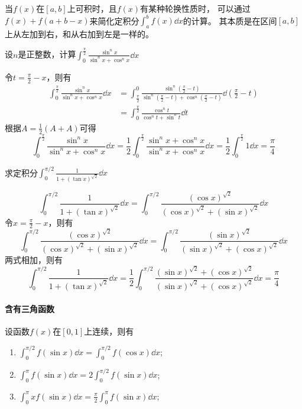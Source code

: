 当$f(x)$在$[a,b]$上可积时，且$f(x)$有某种轮换性质时，
可以通过$f(x)+f(a+b-x)$来简化定积分$\displaystyle\int_a^bf(x)\dd{x}$的计算。
其本质是在区间$[a,b]$上从左加到右，和从右加到左是一样的。
\begin{example}
    设$n$是正整数，计算$\displaystyle\int_0^{\frac{\pi}{2}}\frac{\sin^n x}{\sin^n x + \cos^n x}\dd{x}$
\end{example}
\begin{solution}
    令$t=\frac{\pi}{2}-x$，则有
    \begin{align*}
        \int_0^{\frac{\pi}{2}}\frac{\sin^n x}{\sin^n x + \cos^n x}\dd{x}
         & = \int_{\frac{\pi}{2}}^0\frac{\sin^n \left(\frac{\pi}{2}-t\right)}{\sin^n \left(\frac{\pi}{2}-t\right) + \cos^n \left(\frac{\pi}{2}-t\right)}\dd(\frac{\pi}{2}-t) \\
         & = \int_0^{\frac{\pi}{2}}\frac{\cos^n t}{\cos^n t + \sin^n t}\dd{t}
    \end{align*}
    根据$A = \frac{1}{2}(A+A)$可得
    \[
        \int_0^{\frac{\pi}{2}}\frac{\sin^n x}{\sin^n x + \cos^n x}\dd{x}
        =
        \frac{1}{2}\int_0^{\frac{\pi}{2}}\frac{\sin^n x + \cos^nx}{\sin^n x + \cos^n x}\dd{x}
        =
        \frac{1}{2}\int_0^{\frac{\pi}{2}} 1\dd{x}
        =
        \frac{\pi}{4}
    \]
\end{solution}

\begin{example}
    求定积分$\displaystyle\int_0^{\pi/2} \frac{1}{1+(\tan x)^{\sqrt{2}}}\dd{x}$
\end{example}
\begin{solution}
    \[
        \int_0^{\pi/2} \frac{1}{1+(\tan x)^{\sqrt{2}}}\dd{x}
        =
        \int_0^{\pi/2} \frac{(\cos x)^{\sqrt{2}}}{(\cos x)^{\sqrt{2}}+(\sin x)^{\sqrt{2}}}\dd{x}
    \]
    令$x=\frac{\pi}{2}-x$，则有
    \[
        \int_0^{\pi/2} \frac{(\cos x)^{\sqrt{2}}}{(\cos x)^{\sqrt{2}}+(\sin x)^{\sqrt{2}}}\dd{x}
        =
        \int_0^{\pi/2} \frac{(\sin x)^{\sqrt{2}}}{(\sin x)^{\sqrt{2}}+(\cos x)^{\sqrt{2}}}\dd{x}
    \]
    两式相加，则有
    \[
        \int_0^{\pi/2} \frac{1}{1+(\tan x)^{\sqrt{2}}}\dd{x}
        =
        \frac{1}{2} \int_0^{\pi/2} \frac{(\sin x)^{\sqrt{2}} + (\cos x)^{\sqrt{2}}}{(\sin x)^{\sqrt{2}}+(\cos x)^{\sqrt{2}}}\dd{x}
        =
        \frac{\pi}{4}
    \]
\end{solution}

\paragraph{含有三角函数}
设函数$f(x)$在$[0,1]$上连续，则有
\begin{enumerate}[(1)]
    \item $\displaystyle \int_0^{\pi/2}f(\sin x)\dd{x} = \int_0^{\pi/2}f(\cos x)\dd{x}$;
    \item $\displaystyle \int_0^{\pi}f(\sin x)\dd{x} = 2\int_0^{\pi/2}f(\sin x)\dd{x}$;
    \item $\displaystyle \int_0^{\pi}xf(\sin x)\dd{x} = \frac{\pi}{2}\int_0^{\pi}f(\sin x)\dd{x}$;
\end{enumerate}

